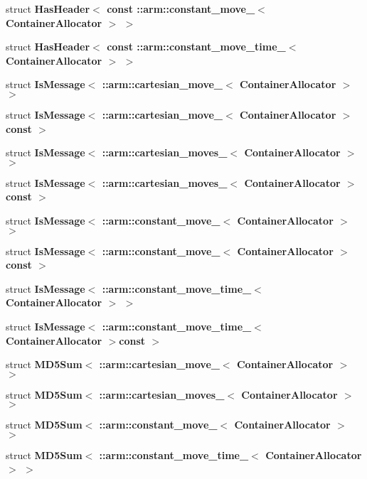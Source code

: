 \begin{DoxyCompactItemize}
\item 
struct {\bf \-Has\-Header$<$ const \-::arm\-::constant\-\_\-move\-\_\-$<$ Container\-Allocator $>$ $>$}
\item 
struct {\bf \-Has\-Header$<$ const \-::arm\-::constant\-\_\-move\-\_\-time\-\_\-$<$ Container\-Allocator $>$ $>$}
\item 
struct {\bf \-Is\-Message$<$ \-::arm\-::cartesian\-\_\-move\-\_\-$<$ Container\-Allocator $>$ $>$}
\item 
struct {\bf \-Is\-Message$<$ \-::arm\-::cartesian\-\_\-move\-\_\-$<$ Container\-Allocator $>$const  $>$}
\item 
struct {\bf \-Is\-Message$<$ \-::arm\-::cartesian\-\_\-moves\-\_\-$<$ Container\-Allocator $>$ $>$}
\item 
struct {\bf \-Is\-Message$<$ \-::arm\-::cartesian\-\_\-moves\-\_\-$<$ Container\-Allocator $>$const  $>$}
\item 
struct {\bf \-Is\-Message$<$ \-::arm\-::constant\-\_\-move\-\_\-$<$ Container\-Allocator $>$ $>$}
\item 
struct {\bf \-Is\-Message$<$ \-::arm\-::constant\-\_\-move\-\_\-$<$ Container\-Allocator $>$const  $>$}
\item 
struct {\bf \-Is\-Message$<$ \-::arm\-::constant\-\_\-move\-\_\-time\-\_\-$<$ Container\-Allocator $>$ $>$}
\item 
struct {\bf \-Is\-Message$<$ \-::arm\-::constant\-\_\-move\-\_\-time\-\_\-$<$ Container\-Allocator $>$const  $>$}
\item 
struct {\bf \-M\-D5\-Sum$<$ \-::arm\-::cartesian\-\_\-move\-\_\-$<$ Container\-Allocator $>$ $>$}
\item 
struct {\bf \-M\-D5\-Sum$<$ \-::arm\-::cartesian\-\_\-moves\-\_\-$<$ Container\-Allocator $>$ $>$}
\item 
struct {\bf \-M\-D5\-Sum$<$ \-::arm\-::constant\-\_\-move\-\_\-$<$ Container\-Allocator $>$ $>$}
\item 
struct {\bf \-M\-D5\-Sum$<$ \-::arm\-::constant\-\_\-move\-\_\-time\-\_\-$<$ Container\-Allocator $>$ $>$}
\end{DoxyCompactItemize}
